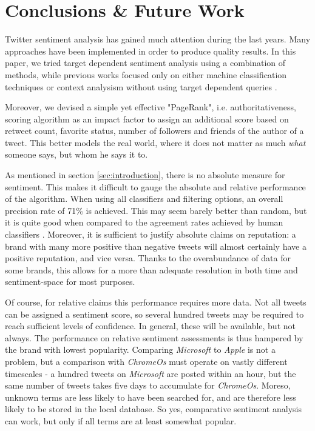 
\section{Conclusions \& Future Work}             %
Twitter sentiment analysis has gained much attention during the last years. Many approaches have been implemented in order to produce quality results. In this paper, we tried target dependent sentiment analysis using a combination of methods, while previous works focused only on either machine classification techniques or context analysism without using target dependent queries \cite{jiang2011target}\cite{go2009twitter}.

Moreover, we devised a simple yet effective "PageRank", i.e. authoritativeness, scoring algorithm as an impact factor to assign an additional score based on retweet count, favorite status, number of followers and friends of the author of a tweet. This better models the real world, where it does not matter as much \emph{what} someone says, but whom he says it to.

As mentioned in section \ref{sec:introduction}, there is no absolute measure for sentiment. This makes it difficult to gauge the absolute and relative performance of the algorithm. When using all classifiers and filtering options, an overall precision rate of 71\% is achieved. This may seem barely better than random, but it is quite good when compared to the agreement rates achieved by human classifiers \cite{wilson2005recognizing}. Moreover, it is sufficient to justify absolute claims on reputation: a brand with many more positive than negative tweets will almost certainly have a positive reputation, and vice versa. Thanks to the overabundance of data for some brands, this allows for a more than adequate resolution in both time and sentiment-space for most purposes.

Of course, for relative claims this performance requires more data. Not all tweets can be assigned a sentiment score, so several hundred tweets may be required to reach sufficient levels of confidence. In general, these will be available, but not always. The performance on relative sentiment assessments is thus hampered by the brand with lowest popularity. Comparing \emph{Microsoft} to \emph{Apple} is not a problem, but a comparison with \emph{ChromeOs} must operate on vastly different timescales - a hundred tweets on \emph{Microsoft} are posted within an hour, but the same number of tweets takes five days to accumulate for \emph{ChromeOs}. Moreso, unknown terms are less likely to have been searched for, and are therefore less likely to be stored in the local database. So yes, comparative sentiment analysis can work, but only if all terms are at least somewhat popular.

